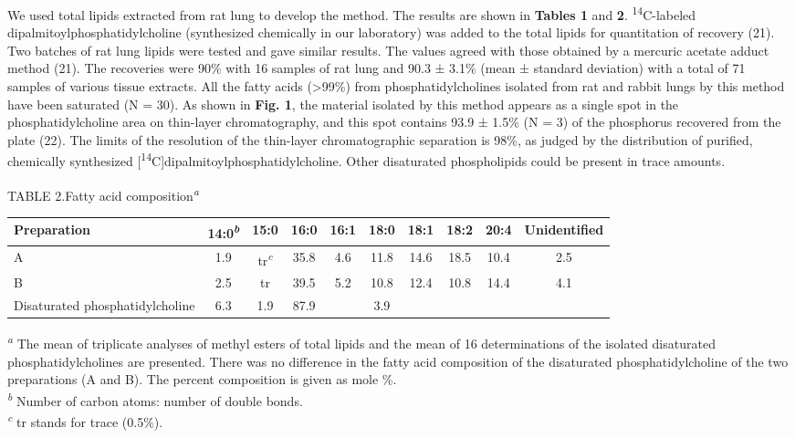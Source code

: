 \documentclass{article}
\begin{document}
We used total lipids extracted from rat lung to develop the method. The results are shown in \textbf{Tables 1} and \textbf{2}. \textsuperscript{14}C-labeled dipalmitoylphosphatidylcholine (synthesized chemically in our laboratory) was added to the total lipids for quantitation of recovery (21). Two batches of rat lung lipids were tested and gave similar results. The values agreed with those obtained by a mercuric acetate adduct method (21). The recoveries were 90\% with 16 samples of rat lung and 90.3 ± 3.1\% (mean ± standard deviation) with a total of 71 samples of various tissue extracts. All the fatty acids (>99\%) from phosphatidylcholines isolated from rat and rabbit lungs by this method have been saturated (N = 30). As shown in \textbf{Fig. 1}, the material isolated by this method appears as a single spot in the phosphatidylcholine area on thin-layer chromatography, and this spot contains 93.9 ± 1.5\% (N = 3) of the phosphorus recovered from the plate (22). The limits of the resolution of the thin-layer chromatographic separation is 98\%, as judged by the distribution of purified, chemically synthesized [\textsuperscript{14}C]dipalmitoylphosphatidylcholine. Other disaturated phospholipids could be present in trace amounts.

\begin{center}
\noindent TABLE 2.\quad Fatty acid composition\textsuperscript{\emph{a}}\par\smallskip
\small
\begin{tabular}{lccccccccc}
\toprule
Preparation & 14:0\textsuperscript{\emph{b}} & 15:0 & 16:0 & 16:1 & 18:0 & 18:1 & 18:2 & 20:4 & Unidentified \\
\midrule
A & 1.9 & tr\textsuperscript{\emph{c}} & 35.8 & 4.6 & 11.8 & 14.6 & 18.5 & 10.4 & 2.5 \\
B & 2.5 & tr & 39.5 & 5.2 & 10.8 & 12.4 & 10.8 & 14.4 & 4.1 \\
Disaturated phosphatidylcholine & 6.3 & 1.9 & 87.9 & & 3.9 & & & & \\
\bottomrule
\end{tabular}
\end{center}
{\small\noindent\textsuperscript{\emph{a}} The mean of triplicate analyses of methyl esters of total lipids and the mean of 16 determinations of the isolated disaturated phosphatidylcholines are presented. There was no difference in the fatty acid composition of the disaturated phosphatidylcholine of the two preparations (A and B). The percent composition is given as mole \%.\\
\textsuperscript{\emph{b}} Number of carbon atoms: number of double bonds.\\
\textsuperscript{\emph{c}} tr stands for trace (0.5\%).\par}
\end{document}
